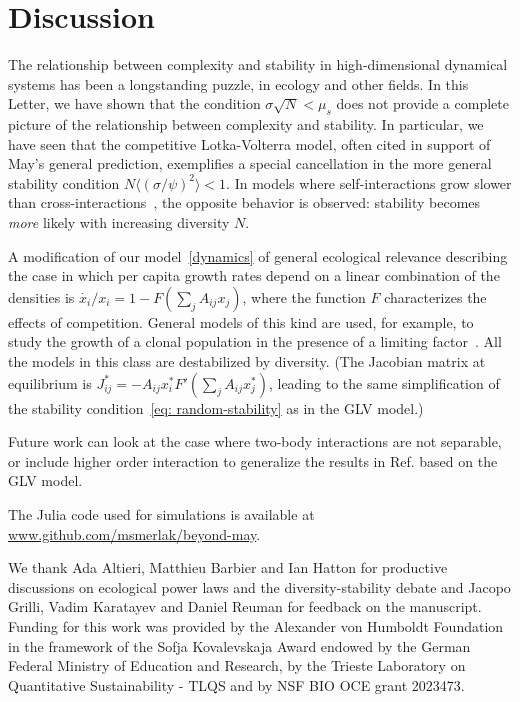 \documentclass[
 pre,
 twocolumn,
 amsmath,
 amssymb,
 aps,
]{revtex4-2}
\begin{document}
\section{Discussion}The relationship between complexity and stability in high-dimensional dynamical systems has been a longstanding puzzle, in ecology and other fields. 
In this Letter, we have shown that the condition $\sigma\sqrt{N}< \mu_s$ does not provide a complete picture of the relationship between complexity and stability. 
In particular, we have seen that the competitive Lotka-Volterra model, often cited in support of May's general prediction, exemplifies a special cancellation in the more general stability condition $N\langle (\sigma/\psi)^2\rangle < 1$.
In models where self-interactions grow slower than cross-interactions~\cite{Hatton2024,samadder2024interconnection}, the opposite behavior is observed: stability becomes \emph{more} likely with increasing diversity $N$.

A modification of our model~\eqref{dynamics} of general ecological relevance describing the case in which per capita growth rates depend on a linear combination of the densities is $\dot{x_i}/x_i=1-F(\sum_jA_{ij}x_j)$, where the function $F$ characterizes the effects of competition.
General models of this kind are used, for example, to study the growth of a clonal population in the presence of a limiting factor~\cite{mazzolini2023universality}.
All the models in this class are destabilized by diversity. (The Jacobian matrix at equilibrium is $J_{ij}^*=-A_{ij}x_i^*F'(\sum_jA_{ij}x_j^*)$, leading to the same simplification of the stability condition~\eqref{eq: random-stability} as in the GLV model.)

Future work can look at the case where two-body interactions are not separable, or include higher order interaction to generalize the results in Ref. \cite{Gibbs2022} based on the GLV model. 

\medskip

The Julia code used for simulations is available at \url{www.github.com/msmerlak/beyond-may}.

\begin{acknowledgments}
We thank Ada Altieri, Matthieu Barbier and Ian Hatton for productive discussions on ecological power laws and the diversity-stability debate and Jacopo Grilli, Vadim Karatayev and Daniel Reuman for feedback on the manuscript.
Funding for this work was provided by the Alexander von Humboldt Foundation in the framework of the Sofja Kovalevskaja Award endowed by the German Federal Ministry of Education and Research, by the Trieste Laboratory on Quantitative Sustainability - TLQS and by NSF BIO OCE grant 2023473.
\end{acknowledgments}
\end{document}
